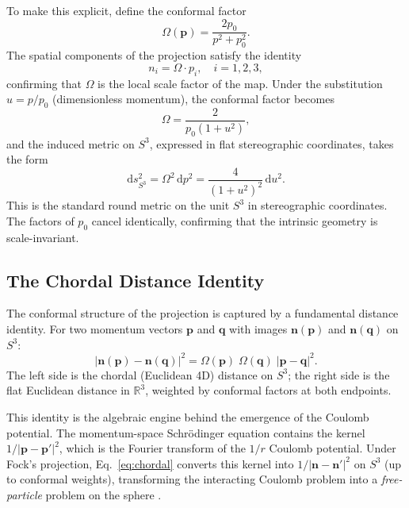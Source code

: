 \documentclass[aps,pra,twocolumn,superscriptaddress,longbibliography]{revtex4-2}
\begin{document}
To make this explicit, define the conformal factor
\begin{equation}
\Omega(\mathbf{p}) = \frac{2p_0}{p^2 + p_0^2}.
\label{eq:conformal_factor}
\end{equation}
The spatial components of the projection satisfy the identity
\begin{equation}
n_i = \Omega \cdot p_i, \quad i = 1, 2, 3,
\label{eq:ni_omega}
\end{equation}
confirming that $\Omega$ is the local scale factor of the map. Under the substitution $u = p/p_0$ (dimensionless momentum), the conformal factor becomes
\begin{equation}
\Omega = \frac{2}{p_0(1 + u^2)},
\end{equation}
and the induced metric on $S^3$, expressed in flat stereographic coordinates, takes the form
\begin{equation}
\mathrm{d}s^2_{S^3} = \Omega^2\, \mathrm{d}p^2 = \frac{4}{(1 + u^2)^2}\, \mathrm{d}u^2.
\label{eq:unit_metric}
\end{equation}
This is the standard round metric on the unit $S^3$ in stereographic coordinates. The factors of $p_0$ cancel identically, confirming that the intrinsic geometry is scale-invariant.

\subsection{The Chordal Distance Identity}

The conformal structure of the projection is captured by a fundamental distance identity. For two momentum vectors $\mathbf{p}$ and $\mathbf{q}$ with images $\mathbf{n}(\mathbf{p})$ and $\mathbf{n}(\mathbf{q})$ on $S^3$:
\begin{equation}
|\mathbf{n}(\mathbf{p}) - \mathbf{n}(\mathbf{q})|^2 = \Omega(\mathbf{p})\;\Omega(\mathbf{q})\; |\mathbf{p} - \mathbf{q}|^2.
\label{eq:chordal}
\end{equation}
The left side is the chordal (Euclidean 4D) distance on $S^3$; the right side is the flat Euclidean distance in $\mathbb{R}^3$, weighted by conformal factors at both endpoints.

This identity is the algebraic engine behind the emergence of the Coulomb potential. The momentum-space Schr\"odinger equation contains the kernel $1/|\mathbf{p} - \mathbf{p}'|^2$, which is the Fourier transform of the $1/r$ Coulomb potential. Under Fock's projection, Eq.~\eqref{eq:chordal} converts this kernel into $1/|\mathbf{n} - \mathbf{n}'|^2$ on $S^3$ (up to conformal weights), transforming the interacting Coulomb problem into a \textit{free-particle} problem on the sphere \cite{fock1935}.
\end{document}

